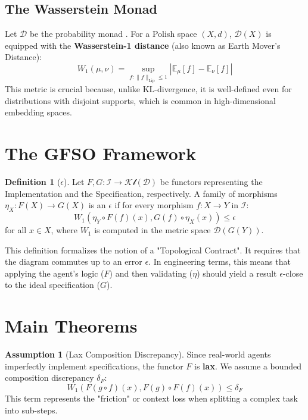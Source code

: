 \documentclass[11pt]{article}
\theoremstyle{definition}
\newtheorem{definition}[theorem]{Definition}
\newtheorem{assumption}[theorem]{Assumption}
\begin{document}
\subsection{The Wasserstein Monad}
 Let $\mathcal{D}$ be the probability monad \cite{billingsley1999}. For a Polish space $(X, d)$, $\mathcal{D}(X)$ is equipped with the \textbf{Wasserstein-1 distance} (also known as Earth Mover's Distance):
\begin{equation}
 W_1(\mu, \nu) = \sup_{f: \|f\|_{\text{Lip}} \le 1} \left| \mathbb{E}_\mu[f] - \mathbb{E}_\nu[f] \right|
\end{equation}
This metric is crucial because, unlike KL-divergence, it is well-defined even for distributions with disjoint supports, which is common in high-dimensional embedding spaces.

\section{The GFSO Framework}

\begin{definition}[$\epsilon$]
 Let $F, G: \mathcal{I} \to \mathcal{Kl}(\mathcal{D})$ be functors representing the Implementation and the Specification, respectively. A family of morphisms $\eta_X: F(X) \to G(X)$ is an $\epsilon$ if for every morphism $f: X \to Y$ in $\mathcal{I}$:
\begin{equation}
 W_1(\eta_Y \circ F(f)(x), G(f) \circ \eta_X(x)) \le \epsilon
\end{equation}
for all $x \in X$, where $W_1$ is computed in the metric space $\mathcal{D}(G(Y))$.
\end{definition}

This definition formalizes the notion of a "Topological Contract". It requires that the diagram commutes up to an error $\epsilon$. In engineering terms, this means that applying the agent's logic ($F$) and then validating ($\eta$) should yield a result $\epsilon$-close to the ideal specification ($G$).

\section{Main Theorems}

\begin{assumption}[Lax Composition Discrepancy]
 Since real-world agents imperfectly implement specifications, the functor $F$ is \textbf{lax}. We assume a bounded composition discrepancy $\delta_F$:
\begin{equation}
 W_1( F(g \circ f)(x), F(g) \circ F(f)(x) ) \le \delta_F
\end{equation}
This term represents the "friction" or context loss when splitting a complex task into sub-steps.
\end{assumption}
\end{document}

